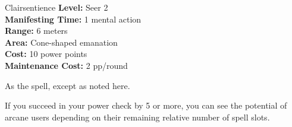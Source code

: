 {Clairsentience}
{
	\textbf{Level:}
	Seer 2\\
	\textbf{Manifesting Time:}
	1 mental action\\
	\textbf{Range:}
	6 meters\\
	\textbf{Area:}
	Cone-shaped emanation\\
	\textbf{Cost:}
	10 power points\\
	\textbf{Maintenance Cost:}
	2 pp/round\\
}
{
	As the  spell, except as noted here.

	If you succeed in your power check by 5 or more, you can see the potential of arcane users depending on their remaining relative number of spell slots.

}